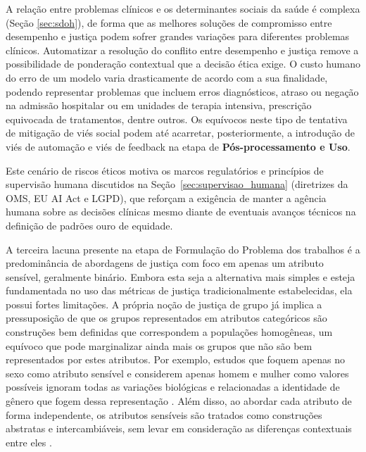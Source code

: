 A relação entre problemas clínicos e os determinantes sociais da saúde é complexa (Seção \ref{sec:sdoh}), de forma que as melhores soluções de compromisso entre desempenho e justiça podem sofrer grandes variações para diferentes problemas clínicos.
Automatizar a resolução do conflito entre desempenho e justiça remove a possibilidade de ponderação contextual que a decisão ética exige. O custo humano do erro de um modelo varia drasticamente de acordo com a sua finalidade, podendo representar problemas que incluem erros diagnósticos, atraso ou negação na admissão hospitalar ou em unidades de terapia intensiva, prescrição equivocada de tratamentos, dentre outros. Os equívocos neste tipo de tentativa de mitigação de viés social podem até acarretar, posteriormente, a introdução de viés de automação e viés de feedback na etapa de \textbf{Pós-processamento e Uso}.

Este cenário de riscos éticos motiva os marcos regulatórios e princípios de supervisão humana discutidos na Seção~\ref{sec:supervisao_humana} (diretrizes da OMS, EU AI Act e LGPD), que reforçam a exigência de manter a agência humana sobre as decisões clínicas mesmo diante de eventuais avanços técnicos na definição de padrões ouro de equidade.

A terceira lacuna presente na etapa de Formulação do Problema dos trabalhos é a predominância de abordagens de justiça com foco em apenas um atributo sensível, geralmente binário. Embora esta seja a alternativa mais simples e esteja fundamentada no uso das métricas de justiça tradicionalmente estabelecidas, ela possui fortes limitações. A própria noção de justiça de grupo já implica a pressuposição de que os grupos representados em atributos categóricos são construções bem definidas que correspondem a populações homogêneas, um equívoco que pode marginalizar ainda mais os grupos que não são bem representados por estes atributos. Por exemplo, estudos que foquem apenas no sexo como atributo sensível e considerem apenas homem e mulher como valores possíveis ignoram todas as variações biológicas e relacionadas a identidade de gênero que fogem dessa representação \cite{park2022fairness}. Além disso, ao abordar cada atributo de forma independente, os atributos sensíveis são tratados como construções abstratas e intercambiáveis, sem levar em consideração as diferenças contextuais entre eles \cite{pfohl2021empirical}.

